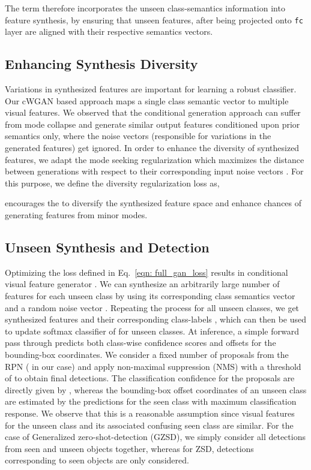 \documentclass[runningheads]{llncs}
\begin{document}
The  term therefore incorporates the unseen class-semantics information into feature synthesis, by ensuring that unseen features, after being projected onto \texttt{fc} layer are aligned with their respective semantics vectors.

\subsection{Enhancing Synthesis Diversity} Variations in synthesized features are important for learning a robust classifier. Our cWGAN based approach maps a single class semantic vector to multiple visual features. We observed that the conditional generation approach can suffer from mode collapse \cite{salimans2016improved} and generate similar output features conditioned upon prior semantics only, where the noise vectors (responsible for variations in the generated features) get ignored. In order to enhance the diversity of synthesized features, we adapt the mode seeking regularization which maximizes the distance between generations with respect to their corresponding input noise vectors \cite{mao2019mode}. For this purpose, we define the diversity regularization loss  as,

 encourages the   to diversify the synthesized feature space and enhance chances of generating features from minor modes. 



 

\subsection{Unseen Synthesis and Detection}
Optimizing the loss defined in Eq.~\ref{eqn: full_gan_loss} results in conditional visual feature generator . We can synthesize an arbitrarily large number of features  for each unseen class by using its corresponding class semantics vector  and a random noise vector . Repeating the process for all unseen classes, we get synthesized features  and their corresponding class-labels , which can then be used to update softmax classifier  of  for unseen classes. 
At inference, a simple forward pass through  predicts both class-wise confidence scores and offsets for the bounding-box coordinates. We consider a fixed number of proposals from the RPN ( in our case) and apply non-maximal suppression (NMS) with a threshold of  to obtain final detections. The classification confidence for the proposals are directly given by , whereas the bounding-box offset coordinates of an unseen class are estimated by the predictions for the seen class with maximum classification response. We observe that this is a reasonable assumption since visual features for the unseen class and its associated confusing seen class are similar. For the case of Generalized zero-shot-detection (GZSD), we simply consider all detections from seen and unseen objects together, whereas for ZSD, detections corresponding to seen objects are only considered. 
\end{document}
